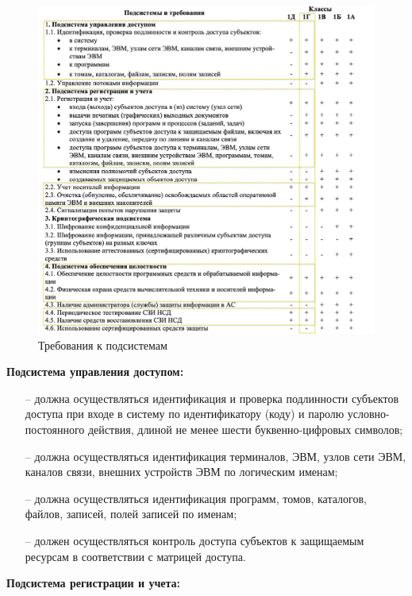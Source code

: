 \begin{figure}[H]
  \centering
  \includegraphics[width=1.1\textwidth]{pict/20}
  \caption{Требования к подсистемам}
  \label{fig:1}
\end{figure}

\textbf{Подсистема управления доступом:}
\begin{itemize}
  \item[--] должна осуществляться идентификация и проверка подлинности субъектов доступа при входе в систему по идентификатору 
  (коду) и паролю условно-постоянного действия, длиной не менее шести буквенно-цифровых символов;
  \item[--] должна осуществляться идентификация терминалов, ЭВМ, узлов сети ЭВМ, каналов связи, внешних устройств ЭВМ по логическим именам;
  \item[--] должна осуществляться идентификация программ, томов, каталогов, файлов, записей, полей записей по именам;
  \item[--] должен осуществляться контроль доступа субъектов к защищаемым ресурсам в соответствии с матрицей доступа.
\end{itemize}
\textbf{Подсистема регистрации и учета:}

